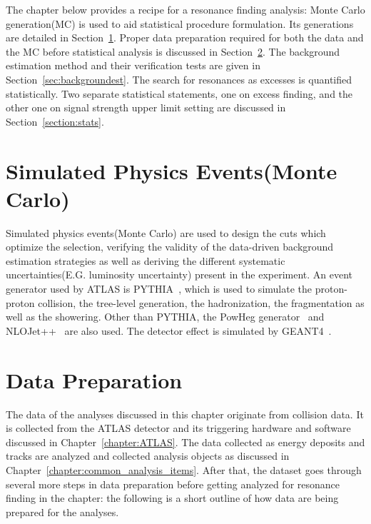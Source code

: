 The chapter below provides a recipe for a resonance finding analysis: Monte Carlo generation(MC) is used to aid statistical procedure formulation. Its generations are detailed in Section~\ref{sec:MC}. Proper data preparation required for both the data and the MC before statistical analysis is discussed in Section~\ref{sec:dataprep}. The background estimation method and their verification tests are given in Section~\ref{sec:backgroundest}. The search for resonances as excesses is quantified statistically. Two separate statistical statements, one on excess finding, and the other one on signal strength upper limit setting are discussed in Section~\ref{section:stats}. 

\section{Simulated Physics Events(Monte Carlo)}
\label{sec:MC}
Simulated physics events(Monte Carlo) are used to design the cuts which optimize the selection, verifying the validity of the data-driven background estimation strategies as well as deriving the different systematic uncertainties(E.G. luminosity uncertainty) present in the experiment.
An event generator used by ATLAS is PYTHIA~\cite{PYTHIA}, which is used to simulate the proton-proton collision, the tree-level generation, the hadronization, the fragmentation as well as the showering. 
Other than PYTHIA, the PowHeg generator~\cite{oleari2010powheg} and NLOJet++~\cite{nagynlojet++} are also used. The detector effect is simulated by GEANT4~\cite{Agostinelli:602040}.



\section{Data Preparation}
\label{sec:dataprep}
The data of the analyses discussed in this chapter originate from collision data. It is collected from the ATLAS detector and its triggering hardware and software discussed in Chapter~\ref{chapter:ATLAS}. The data collected as energy deposits and tracks are analyzed and collected analysis objects as discussed in Chapter~\ref{chapter:common_analysis_items}. After that, the dataset goes through several more steps in data preparation before getting analyzed for resonance finding in the chapter: the following is a short outline of how data are being prepared for the analyses.

